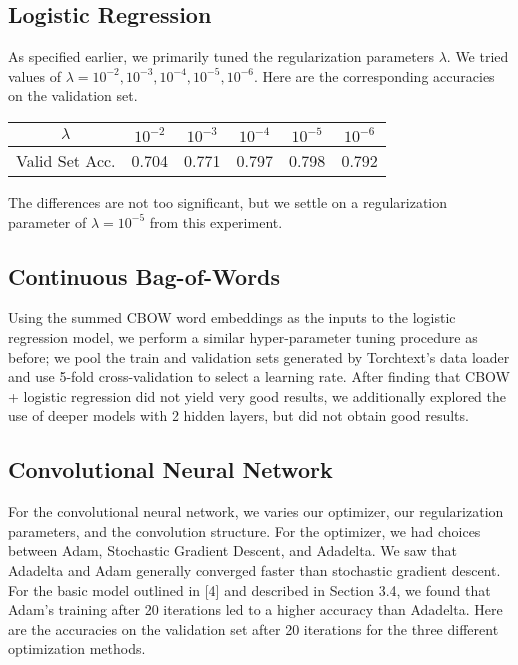 \documentclass[11pt]{article}
\begin{document}
\subsection{Logistic Regression}

As specified earlier, we primarily tuned the regularization parameters $\lambda$.  We tried values of $\lambda = 10^{-2}, 10^{-3}, 10^{-4}, 10^{-5}, 10^{-6}$.  Here are the corresponding accuracies on the validation set.

\begin{center}
\begin{tabular}{ c | c c c c c}
$\lambda$ & $10^{-2}$ & $10^{-3}$ & $10^{-4}$ & $10^{-5}$ & $10^{-6}$ \\
\hline
Valid Set Acc. & 0.704 & 0.771 & 0.797 & 0.798 & 0.792 
\end{tabular}
\end{center}
The differences are not too significant, but we settle on a regularization parameter of $\lambda = 10^{-5}$ from this experiment.  

\subsection{Continuous Bag-of-Words}
Using the summed CBOW word embeddings as the inputs to the logistic regression model, we perform a similar hyper-parameter tuning procedure as before; we pool the train and validation sets generated by Torchtext's data loader and use 5-fold cross-validation to select a learning rate. After finding that CBOW + logistic regression did not yield very good results, we additionally explored the use of deeper models with 2 hidden layers, but did not obtain good results.

\subsection{Convolutional Neural Network}

For the convolutional neural network, we varies our optimizer, our regularization parameters, and the convolution structure.  For the optimizer, we had choices between Adam, Stochastic Gradient Descent, and Adadelta.  We saw that Adadelta and Adam generally converged faster than stochastic gradient descent.  For the basic model outlined in [4] and described in Section 3.4, we found that Adam's training after 20 iterations led to a higher accuracy than Adadelta.  Here are the accuracies on the validation set after 20 iterations for the three different optimization methods.  
\end{document}
